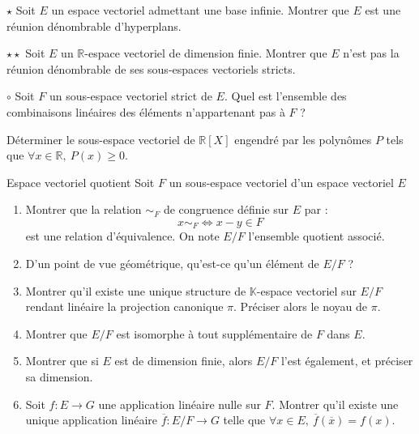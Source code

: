 \documentclass[french,a4paper]{article}
\newcommand{\R}{\mathbb{R}}
\newcommand{\K}{\mathbb{K}}
\theoremstyle{plain}
\theoremstyle{definition}
\theoremstyle{remark}
\begin{document}
\begin{ex}[Moulin.02]{$\star$}
	Soit $E$ un espace vectoriel admettant une base infinie. Montrer que $E$ est une réunion dénombrable d'hyperplans.
\end{ex}

\begin{ex}[Moulin.03]{$\star\star$}
	Soit $E$ un $\R$-espace vectoriel de dimension finie. Montrer que $E$ n'est pas la réunion dénombrable de ses sous-espaces vectoriels stricts.
\end{ex}

\begin{ex}[Moulin.04]{$\circ$}
	Soit $F$ un sous-espace vectoriel strict de $E$. Quel est l'ensemble des combinaisons linéaires des éléments n'appartenant pas à $F$ ?
\end{ex}

\begin{ex}[Moulin.05]{}
	Déterminer le sous-espace vectoriel de $\R[X]$ engendré par les polynômes $P$ tels que $\forall x\in\R,\ P(x)\geqslant 0$.
\end{ex}

\begin{ex}[Moulin.06]{Espace vectoriel quotient}
	Soit $F$ un sous-espace vectoriel d'un espace vectoriel $E$
	\begin{enumerate}
		\item Montrer que la relation $\sim_F$ de congruence définie sur $E$ par : $$x\sim_F\iff x-y\in F$$ est une relation d'équivalence. On note $E/F$ l'ensemble quotient associé.
		\item D'un point de vue géométrique, qu'est-ce qu'un élément de $E/F$ ?
		\item Montrer qu'il existe une unique structure de $\K$-espace vectoriel sur $E/F$ rendant linéaire la projection canonique $\pi$. Préciser alors le noyau de $\pi$.
		\item Montrer que $E/F$ est isomorphe à tout supplémentaire de $F$ dans $E$.
		\item Montrer que si $E$ est de dimension finie, alors $E/F$ l'est également, et préciser sa dimension.
		\item Soit $f:E\to G$ une application linéaire nulle sur $F$. Montrer qu'il existe une unique application linéaire $\overline{f}:E/F\to G$ telle que $\forall x\in E,\ \overline{f}(\overline{x})=f(x)$.
	\end{enumerate}
\end{ex}
\end{document}
